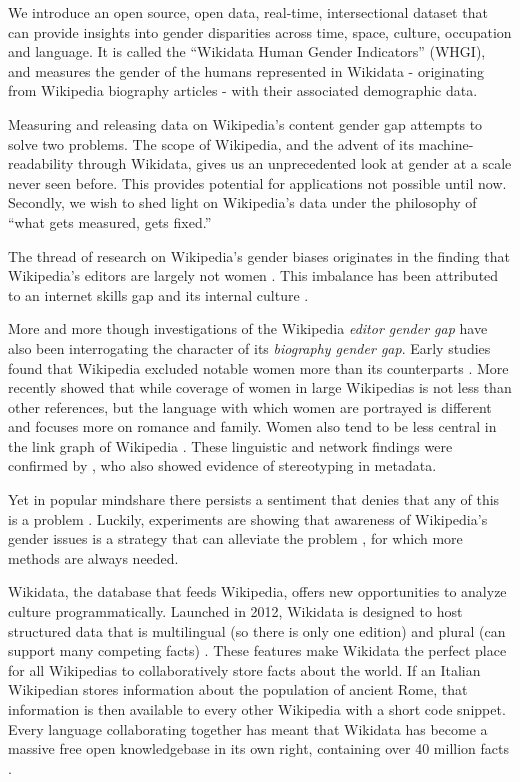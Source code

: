 \documentclass[letterpaper]{article}
\begin{document}
We introduce an open source, open data, real-time, intersectional dataset that can provide insights into gender disparities across time, space, culture, occupation and language. It is called the ``Wikidata Human Gender Indicators'' (WHGI), and measures the gender of the humans represented in Wikidata - originating from Wikipedia biography articles - with their associated demographic data.

Measuring and releasing data on Wikipedia's content gender gap attempts to solve two problems. The scope of Wikipedia, and the advent of its machine-readability through Wikidata, gives us an unprecedented look at gender at a scale never seen before. This provides potential for applications not possible until now. Secondly, we wish to shed light on Wikipedia's data under the philosophy of ``what gets measured, gets fixed.''

The thread of research on Wikipedia's gender biases originates in the finding that Wikipedia's editors are largely not women \cite{hill_wikipedia_2013}. This imbalance has been attributed to an internet skills gap \cite{hargittai_mind_2015} and its internal culture \cite{lam_wp:clubhouse?:_2011}. 

More and more though investigations of the Wikipedia \textit{editor gender gap} have also been interrogating the character of its \textit{biography gender gap}. Early studies found that Wikipedia excluded notable women more than its counterparts \cite{reagle_gender_2011}. More recently \cite{wagner_its_2015} showed that while coverage of women in large Wikipedias is not less than other references, but the language with which women are portrayed is different and focuses more on romance and family. Women also tend to be less central in the link graph of Wikipedia \cite{10.1371/journal.pone.0114825}. These linguistic and network findings were confirmed by \cite{graells-garrido_first_2015}, who also showed evidence of stereotyping in metadata. 

Yet in popular mindshare there persists a sentiment that denies that any of this is a problem \cite{eckert_retriggering_2013}. Luckily, experiments are showing that awareness of Wikipedia's gender issues is a strategy that can alleviate the problem \cite{hinnosaar_gender_2015}, for which more methods are always needed.

Wikidata, the database that feeds Wikipedia, offers new opportunities to analyze culture programmatically. Launched in 2012, Wikidata is designed to host structured data that is multilingual (so there is only one edition) and plural (can support many competing facts) \cite{vrandecic_wikidata:_2014}.  These features make Wikidata the perfect place for all Wikipedias to collaboratively store facts about the world. If an Italian Wikipedian stores information about the population of ancient Rome, that information is then available to every other Wikipedia with a short code snippet. Every language collaborating together has meant that Wikidata has become a massive free open knowledgebase in its own right, containing over 40 million facts \cite{krotzsch_how_????}.
\end{document}

